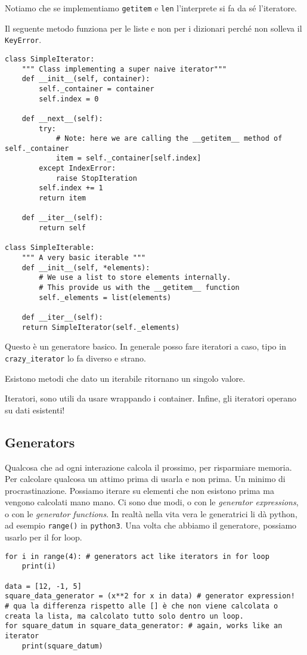 \documentclass[10pt, a4paper, titlepage]{book}
\begin{document}
Notiamo che se implementiamo \texttt{getitem} e \texttt{len} l'interprete si fa da sé l'iteratore.

Il seguente metodo funziona per le liste e non per i dizionari perché non solleva il \texttt{KeyError}.

\begin{verbatim}
class SimpleIterator:
	""" Class implementing a super naive iterator"""
	def __init__(self, container):
		self._container = container
		self.index = 0

	def __next__(self):
		try:
			# Note: here we are calling the __getitem__ method of self._container
			item = self._container[self.index]
		except IndexError:
			raise StopIteration
		self.index += 1
		return item
	
	def __iter__(self):
		return self

class SimpleIterable:
	""" A very basic iterable """
	def __init__(self, *elements):
		# We use a list to store elements internally.
		# This provide us with the __getitem__ function
		self._elements = list(elements)

	def __iter__(self):
	return SimpleIterator(self._elements)
\end{verbatim}

Questo è un generatore basico. In generale posso fare iteratori a caso, tipo in \texttt{crazy_iterator} lo fa diverso e strano.

Esistono metodi che dato un iterabile ritornano un singolo valore.

Iteratori, sono utili da usare wrappando i container.
Infine, gli iteratori operano su dati esistenti!

\subsection{Generators}

Qualcosa che ad ogni interazione calcola il prossimo, per risparmiare memoria. Per calcolare qualcosa un attimo prima di usarla e non prima. 
Un minimo di procrastinazione.
Possiamo iterare su elementi che non esistono prima ma vengono calcolati mano mano. 
Ci sono due modi, o con le \textit{generator expressions}, o con le \textit{generator functions}. In realtà nella vita vera le generatrici li dà python, ad esempio \texttt{range()} in \texttt{python3}.
Una volta che abbiamo il generatore, possiamo usarlo per il for loop.

\begin{verbatim}
for i in range(4): # generators act like iterators in for loop
	print(i)

data = [12, -1, 5]
square_data_generator = (x**2 for x in data) # generator expression!
# qua la differenza rispetto alle [] è che non viene calcolata o creata la lista, ma calcolato tutto solo dentro un loop.
for square_datum in square_data_generator: # again, works like an iterator
	print(square_datum)
\end{verbatim}
\end{document}
